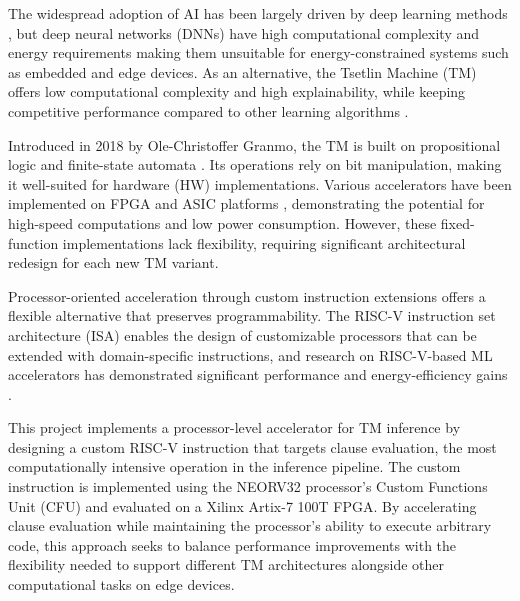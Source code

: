 

The widespread adoption of AI has been largely driven by deep learning methods \cite{Lecun2015436}, but deep neural networks (DNNs) have high computational complexity and energy requirements making them unsuitable for energy-constrained systems such as embedded and edge devices. As an alternative, the Tsetlin Machine (TM) offers low computational complexity and high explainability, while keeping competitive performance compared to other learning algorithms \cite{GranmoOle-Christoffer2018TTM-}.

Introduced in 2018 by Ole-Christoffer Granmo, the TM is built on propositional logic and finite-state automata \cite{GranmoOle-Christoffer2018TTM-}. Its operations rely on bit manipulation, making it well-suited for hardware (HW) implementations. Various accelerators have been implemented on FPGA and ASIC platforms \cite{AndersTunheimSvein2025AA86,TunheimSveinAnders2023CTMT,TunheimSveinAnders2025TMIC}, demonstrating the potential for high-speed computations and low power consumption. However, these fixed-function implementations lack flexibility, requiring significant architectural redesign for each new TM variant.

Processor-oriented acceleration through custom instruction extensions offers a flexible alternative that preserves programmability. The RISC-V instruction set architecture (ISA) enables the design of customizable processors that can be extended with domain-specific instructions, and research on RISC-V-based ML accelerators has demonstrated significant performance and energy-efficiency gains \cite{NunesWillianAnaldo2025AMLw, WangShihang2024OCCU,GarofaloAngelo2021XEEE}. 

This project implements a processor-level accelerator for TM inference by designing a custom RISC-V instruction that targets clause evaluation, the most computationally intensive operation in the inference pipeline. The custom instruction is implemented using the NEORV32 processor's Custom Functions Unit (CFU) and evaluated on a Xilinx Artix-7 100T FPGA. By accelerating clause evaluation while maintaining the processor's ability to execute arbitrary code, this approach seeks to balance performance improvements with the flexibility needed to support different TM architectures alongside other computational tasks on edge devices.